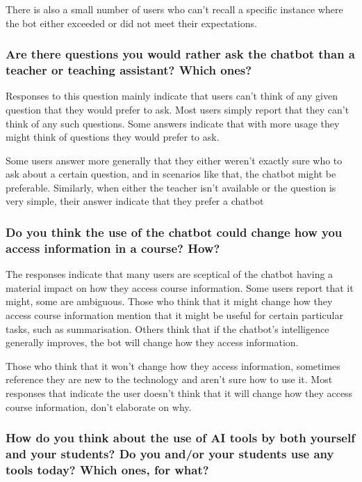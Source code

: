 There is also a small number of users who can’t recall a specific instance where the bot either exceeded or did not meet their expectations.


\subsubsection{Are there questions you would rather ask the chatbot than a teacher or teaching assistant? Which ones?}


Responses to this question mainly indicate that users can’t think of any given question that they would prefer to ask. Most users simply report that they can’t think of any such questions. Some answers indicate that with more usage they might think of questions they would prefer to ask.


Some users answer more generally that they either weren't exactly sure who to ask about a certain question, and in scenarios like that, the chatbot might be preferable. Similarly, when either the teacher isn’t available or the question is very simple, their answer indicate that they prefer a chatbot


\subsubsection{Do you think the use of the chatbot could change how you access information in a course? How?}


The responses indicate that many users are sceptical of the chatbot having a material impact on how they access course information. Some users report that it might, some are ambiguous. Those who think that it might change how they access course information mention that it might be useful for certain particular tasks, such as summarisation. Others think that if the chatbot’s intelligence generally improves, the bot will change how they access information.


Those who think that it won’t change how they access information, sometimes reference they are new to the technology and aren’t sure how to use it. Most responses that indicate the user doesn’t think that it will change how they access course information, don't elaborate on why.




\subsubsection{How do you think about the use of AI tools by both yourself and your students? Do you and/or your students use any tools today? Which ones, for what?}


